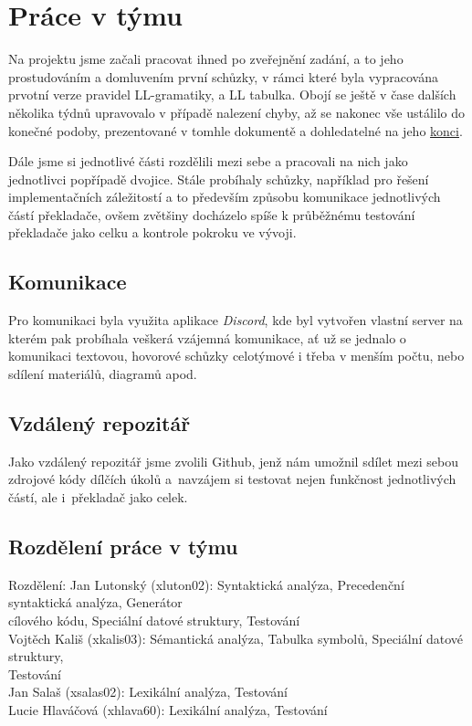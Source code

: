 \documentclass[a4paper, 11pt]{article}
\begin{document}
	\section{Práce v týmu}
	Na projektu jsme začali pracovat ihned po zveřejnění zadání, a to jeho prostudováním a domluvením první schůzky, v rámci které byla vypracována prvotní 
	verze pravidel LL-gramatiky, a LL tabulka. Obojí se ještě v čase dalších několika týdnů upravovalo v případě nalezení chyby, až se nakonec vše ustálilo do 
	konečné podoby, prezentované v tomhle dokumentě a dohledatelné na jeho \hyperref[gram]{konci}.
	
	Dále jsme si jednotlivé části rozdělili mezi sebe a pracovali na nich jako jednotlivci popřípadě dvojice. Stále probíhaly schůzky, například pro řešení 
	implementačních záležitostí a to především způsobu komunikace jednotlivých částí překladače, ovšem zvětšiny docházelo spíše k průběžnému testování 
	překladače jako celku a kontrole pokroku ve vývoji.
	\subsection{Komunikace}
	Pro komunikaci byla využita aplikace \textit{Discord}, kde byl vytvořen vlastní server na kterém pak probíhala veškerá vzájemná komunikace, ať už se 
	jednalo o komunikaci textovou, hovorové schůzky celotýmové i třeba v menším počtu, nebo sdílení materiálů, diagramů apod. 
	\subsection{Vzdálený repozitář}
	Jako vzdálený repozitář jsme zvolili Github, jenž nám umožnil sdílet mezi sebou zdrojové kódy dílčích úkolů a~navzájem si testovat nejen funkčnost 
	jednotlivých částí, ale i~překladač jako celek.
	\subsection{Rozdělení práce v týmu}
	Rozdělení: \hspace*{0.5cm} 	Jan Lutonský (xluton02): \hspace{0.1cm} Syntaktická analýza, Precedenční syntaktická analýza, Generátor \\
			\hspace*{5cm} cílového kódu, Speciální datové struktury, Testování\\
			\hspace*{2.25cm}	Vojtěch Kališ (xkalis03): \hspace{0.1cm} Sémantická analýza, Tabulka symbolů, Speciální datové struktury, \\
			\hspace*{5cm} Testování\\
			\hspace*{2.25cm}	Jan Salaš (xsalas02): \hspace{0.1cm} Lexikální analýza, Testování\\
			\hspace*{2.25cm}	Lucie Hlaváčová (xhlava60): \hspace{0.1cm} Lexikální analýza, Testování\\
\end{document}
